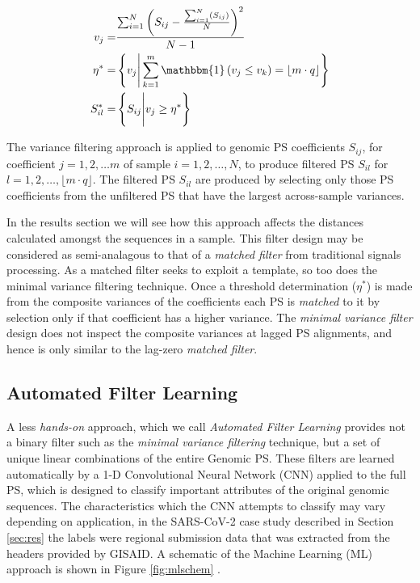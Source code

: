 \documentclass[10pt,conference]{IEEEtran}
\begin{document}
\begin{align} 
\label{eq:var}
\begin{split}
v_j =& \frac{\sum_{i=1}^N\left(S_{ij}-\frac{\sum_{i=1}^N(S_{ij})}{N}\right)^2 }{N-1} \\
\eta^* =& \left\{ v_j \Bigg\vert \sum_{k=1}^m \mathbbm{1}\left( v_j \leq v_k \right) = \lfloor m\cdot q\rfloor \right\}\\
S^*_{il} =& \left\{ S_{ij} \Bigg\vert v_j \geq \eta^* \right\}
\end{split}
\end{align}


The variance filtering approach is applied to genomic PS coefficients  $S_{ij}$, for coefficient $j = 1,2,\dots m$ of sample $i = 1,2,\dots,N$, to produce filtered PS $S_{il}$ for $l = 1,2,\dots,\lfloor m \cdot q \rfloor$. The filtered PS $S_{il}$ are produced by selecting only those PS coefficients from the unfiltered PS that have the largest across-sample variances. 

In the results section we will see how this approach affects the distances calculated amongst the sequences in a sample.  
This filter design may be considered as semi-analagous to that of a \textit{matched filter} from 
traditional signals processing.  
As a matched filter seeks to exploit a template, so too does the minimal variance filtering technique. 
Once a threshold determination ($\eta^*$) is made from the composite variances of the coefficients 
each PS is \textit{matched} to it by selection only if that coefficient has a higher variance.  
The \textit{minimal variance filter} design does not inspect the composite variances at lagged PS alignments, and hence is only similar to the lag-zero \textit{matched filter}. 

\subsection{Automated Filter Learning} 

\noindent A less \textit{hands-on} approach, which we call \textit{Automated Filter Learning}
provides not a binary filter such as the \textit{minimal variance filtering} technique,  but a set of 
unique linear combinations of the entire Genomic PS. 
These filters are learned automatically by a 1-D Convolutional Neural Network (CNN) applied 
to the full PS, which is designed to classify important attributes of the original genomic 
sequences. 
The characteristics which the CNN attempts to classify may vary depending on application, in the 
SARS-CoV-2 case study described in Section \ref{sec:res} the labels were regional submission 
data that was extracted from the headers provided by GISAID. 
A schematic of the Machine Learning (ML) approach is shown in Figure \ref{fig:mlschem} .
\end{document}

